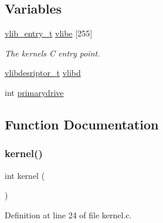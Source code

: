 \subsection*{Variables}
\begin{DoxyCompactItemize}
\item 
\hyperlink{a00194_a97c1a7136f2ab06368e93c2d7533d619_a97c1a7136f2ab06368e93c2d7533d619}{vlib\+\_\+entry\+\_\+t} \hyperlink{a00062_af69f4f709fdab28dec6b8fb75fb4d526_af69f4f709fdab28dec6b8fb75fb4d526}{vlibe} \mbox{[}255\mbox{]}
\begin{DoxyCompactList}\small\item\em The kernels C entry point. \end{DoxyCompactList}\item 
\hyperlink{a00194_a2d9000b4fbb25c5ed2950a2d8f4921d5_a2d9000b4fbb25c5ed2950a2d8f4921d5}{vlibdesriptor\+\_\+t} \hyperlink{a00062_a2125beec541d04796805161dbec05fcf_a2125beec541d04796805161dbec05fcf}{vlibd}
\item 
int \hyperlink{a00062_af37cb131d8a2101addfbf5fb2d8a53b4_af37cb131d8a2101addfbf5fb2d8a53b4}{primarydrive}
\end{DoxyCompactItemize}


\subsection{Function Documentation}
\mbox{\label{a00062_a4ee3d1f05046b7afc6b4d516bf10667a_a4ee3d1f05046b7afc6b4d516bf10667a}} 
\subsubsection{\texorpdfstring{kernel()}{kernel()}}
{\footnotesize\ttfamily int kernel (\begin{DoxyParamCaption}{ }\end{DoxyParamCaption})}



Definition at line 24 of file kernel.\+c.


